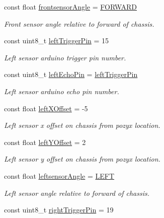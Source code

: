 \begin{DoxyCompactItemize}
const float \mbox{\hyperlink{bot_main_8ino_ad681cfe410d5d764c513368773b9de93}{frontsensor\+Angle}} = \mbox{\hyperlink{bot_main_8ino_a6ddfdda7a062d10cff4a72b76b44aeb8}{F\+O\+R\+W\+A\+RD}}
\begin{DoxyCompactList}\small\item\em Front sensor angle relative to forward of chassis. \end{DoxyCompactList}\item 
const uint8\+\_\+t \mbox{\hyperlink{bot_main_8ino_a297d5238270dc0d92e1a65b016a79f2e}{left\+Trigger\+Pin}} = 15
\begin{DoxyCompactList}\small\item\em Left sensor arduino trigger pin number. \end{DoxyCompactList}\item 
const uint8\+\_\+t \mbox{\hyperlink{bot_main_8ino_a203479aa2174a6eedd63da361e6e302c}{left\+Echo\+Pin}} = \mbox{\hyperlink{bot_main_8ino_a297d5238270dc0d92e1a65b016a79f2e}{left\+Trigger\+Pin}}
\begin{DoxyCompactList}\small\item\em Left sensor arduino echo pin number. \end{DoxyCompactList}\item 
const float \mbox{\hyperlink{bot_main_8ino_a2d121af61e2977de12f5bfbbe8559dca}{left\+X\+Offset}} = -\/5
\begin{DoxyCompactList}\small\item\em Left sensor x offset on chassis from pozyx location. \end{DoxyCompactList}\item 
const float \mbox{\hyperlink{bot_main_8ino_a7be9826e4f54e376321bcdea4177a8ed}{left\+Y\+Offset}} = 2
\begin{DoxyCompactList}\small\item\em Left sensor y offset on chassis from pozyx location. \end{DoxyCompactList}\item 
const float \mbox{\hyperlink{bot_main_8ino_a8be5324bad65fa0bad41e0c70066a958}{leftsensor\+Angle}} = \mbox{\hyperlink{bot_main_8ino_a437ef08681e7210d6678427030446a54}{L\+E\+FT}}
\begin{DoxyCompactList}\small\item\em Left sensor angle relative to forward of chassis. \end{DoxyCompactList}\item 
const uint8\+\_\+t \mbox{\hyperlink{bot_main_8ino_a906054d9d48970211789ac841d331898}{right\+Trigger\+Pin}} = 19

\end{DoxyCompactItemize}
